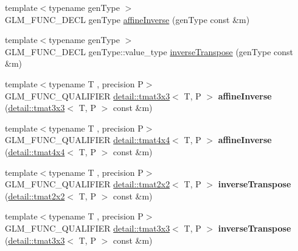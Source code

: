 \begin{DoxyCompactItemize}
\item 
{\footnotesize template$<$typename gen\+Type $>$ }\\G\+L\+M\+\_\+\+F\+U\+N\+C\+\_\+\+D\+E\+CL gen\+Type \hyperlink{group__gtc__matrix__inverse_gae0fcc5fc8783291f9702272de428fa0e}{affine\+Inverse} (gen\+Type const \&m)
\item 
{\footnotesize template$<$typename gen\+Type $>$ }\\G\+L\+M\+\_\+\+F\+U\+N\+C\+\_\+\+D\+E\+CL gen\+Type\+::value\+\_\+type \hyperlink{group__gtc__matrix__inverse_gac23f1be9db49b929cc74e40f17f48593}{inverse\+Transpose} (gen\+Type const \&m)
\item 
{\footnotesize template$<$typename T , precision P$>$ }\\G\+L\+M\+\_\+\+F\+U\+N\+C\+\_\+\+Q\+U\+A\+L\+I\+F\+I\+ER \hyperlink{structglm_1_1detail_1_1tmat3x3}{detail\+::tmat3x3}$<$ T, P $>$ {\bfseries affine\+Inverse} (\hyperlink{structglm_1_1detail_1_1tmat3x3}{detail\+::tmat3x3}$<$ T, P $>$ const \&m)\hypertarget{namespaceglm_ae987f6c5b71756c91d1a4a6f65616ac9}{}\label{namespaceglm_ae987f6c5b71756c91d1a4a6f65616ac9}

\item 
{\footnotesize template$<$typename T , precision P$>$ }\\G\+L\+M\+\_\+\+F\+U\+N\+C\+\_\+\+Q\+U\+A\+L\+I\+F\+I\+ER \hyperlink{structglm_1_1detail_1_1tmat4x4}{detail\+::tmat4x4}$<$ T, P $>$ {\bfseries affine\+Inverse} (\hyperlink{structglm_1_1detail_1_1tmat4x4}{detail\+::tmat4x4}$<$ T, P $>$ const \&m)\hypertarget{namespaceglm_a9c15fbd234b0504882c00b6bccc0f818}{}\label{namespaceglm_a9c15fbd234b0504882c00b6bccc0f818}

\item 
{\footnotesize template$<$typename T , precision P$>$ }\\G\+L\+M\+\_\+\+F\+U\+N\+C\+\_\+\+Q\+U\+A\+L\+I\+F\+I\+ER \hyperlink{structglm_1_1detail_1_1tmat2x2}{detail\+::tmat2x2}$<$ T, P $>$ {\bfseries inverse\+Transpose} (\hyperlink{structglm_1_1detail_1_1tmat2x2}{detail\+::tmat2x2}$<$ T, P $>$ const \&m)\hypertarget{namespaceglm_aadb5ab47ae129fe2b90f976465999629}{}\label{namespaceglm_aadb5ab47ae129fe2b90f976465999629}

\item 
{\footnotesize template$<$typename T , precision P$>$ }\\G\+L\+M\+\_\+\+F\+U\+N\+C\+\_\+\+Q\+U\+A\+L\+I\+F\+I\+ER \hyperlink{structglm_1_1detail_1_1tmat3x3}{detail\+::tmat3x3}$<$ T, P $>$ {\bfseries inverse\+Transpose} (\hyperlink{structglm_1_1detail_1_1tmat3x3}{detail\+::tmat3x3}$<$ T, P $>$ const \&m)\hypertarget{namespaceglm_a821bc03bbd402ee2f77ba43c17a9c24e}{}\label{namespaceglm_a821bc03bbd402ee2f77ba43c17a9c24e}


\end{DoxyCompactItemize}
